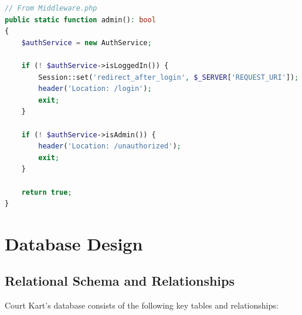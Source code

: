 \documentclass{article}
\begin{document}
\begin{lstlisting}[language=PHP, caption=Admin middleware protection]
// From Middleware.php
public static function admin(): bool
{
    $authService = new AuthService;

    if (! $authService->isLoggedIn()) {
        Session::set('redirect_after_login', $_SERVER['REQUEST_URI']);
        header('Location: /login');
        exit;
    }

    if (! $authService->isAdmin()) {
        header('Location: /unauthorized');
        exit;
    }

    return true;
}
\end{lstlisting}

\section{Database Design}

\subsection{Relational Schema and Relationships}

Court Kart's database consists of the following key tables and relationships:
\end{document}
